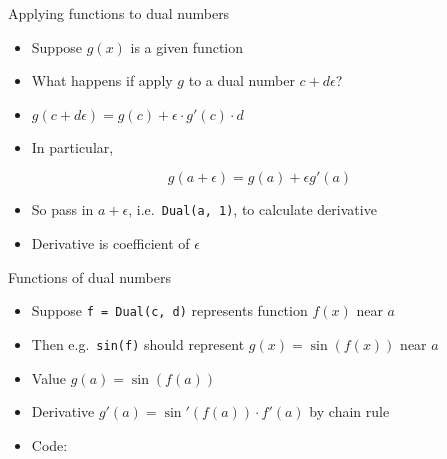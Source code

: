 \begin{frame}[fragile]{Applying functions to dual numbers}
\protect\hypertarget{applying-functions-to-dual-numbers}{}

\begin{itemize}
\item
  Suppose \(g(x)\) is a given function
\item
  What happens if apply \(g\) to a dual number \(c + d \epsilon\)?
\item
  \(g(c + d\epsilon) = g(c) + \epsilon \cdot g'(c) \cdot d\)
\item
  In particular,
\end{itemize}

\[g(a + \epsilon) = g(a) + \epsilon g'(a)\]

\begin{itemize}
\item
  So pass in \(a + \epsilon\), i.e.~\texttt{Dual(a,\ 1)}, to calculate
  derivative
\item
  Derivative is coefficient of \(\epsilon\)
\end{itemize}

\end{frame}

\begin{frame}[fragile]{Functions of dual numbers}
\protect\hypertarget{functions-of-dual-numbers}{}

\begin{itemize}
\item
  Suppose \texttt{f\ =\ Dual(c,\ d)} represents function \(f(x)\) near
  \(a\)
\item
  Then e.g.~\texttt{sin(f)} should represent \(g(x) = \sin(f(x))\) near
  \(a\)
\item
  Value \(g(a) = \sin(f(a))\)
\item
  Derivative \(g'(a) = \sin'(f(a)) \cdot f'(a)\) by chain rule
\item
  Code:

\begin{Shaded}
\begin{Highlighting}[]
\end{Highlighting}
\end{Shaded}
\end{itemize}

\end{frame}

